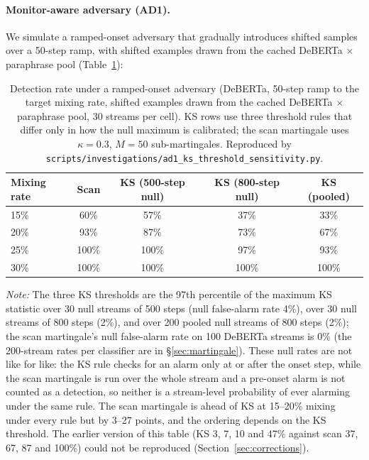 \documentclass{article}
\begin{document}
\paragraph{Monitor-aware adversary (AD1).} We simulate a ramped-onset adversary that gradually introduces shifted samples over a 50-step ramp, with shifted examples drawn from the cached DeBERTa $\times$ paraphrase pool (Table~\ref{tab:ad1}):

\begin{table}[h]
\centering
\small
\caption{Detection rate under a ramped-onset adversary (DeBERTa, 50-step ramp to the target mixing rate, shifted examples drawn from the cached DeBERTa $\times$ paraphrase pool, 30 streams per cell). KS rows use three threshold rules that differ only in how the null maximum is calibrated; the scan martingale uses $\kappa=0.3$, $M=50$ sub-martingales. Reproduced by \texttt{scripts/investigations/ad1\_ks\_threshold\_sensitivity.py}.}
\label{tab:ad1}
\begin{tabular}{lcccc}
\toprule
\textbf{Mixing rate} & \textbf{Scan} & \textbf{KS (500-step null)} & \textbf{KS (800-step null)} & \textbf{KS (pooled)} \\
\midrule
15\% & 60\% & 57\% & 37\% & 33\% \\
20\% & 93\% & 87\% & 73\% & 67\% \\
25\% & 100\% & 100\% & 97\% & 93\% \\
30\% & 100\% & 100\% & 100\% & 100\% \\
\bottomrule
\end{tabular}
\par\vspace{4pt}
{\footnotesize\textit{Note:} The three KS thresholds are the 97th percentile of the maximum KS statistic over 30 null streams of 500 steps (null false-alarm rate 4\%), over 30 null streams of 800 steps (2\%), and over 200 pooled null streams of 800 steps (2\%); the scan martingale's null false-alarm rate on 100 DeBERTa streams is 0\% (the 200-stream rates per classifier are in \S\ref{sec:martingale}). These null rates are not like for like: the KS rule checks for an alarm only at or after the onset step, while the scan martingale is run over the whole stream and a pre-onset alarm is not counted as a detection, so neither is a stream-level probability of ever alarming under the same rule. The scan martingale is ahead of KS at 15--20\% mixing under every rule but by 3--27 points, and the ordering depends on the KS threshold. The earlier version of this table (KS 3, 7, 10 and 47\% against scan 37, 67, 87 and 100\%) could not be reproduced (Section~\ref{sec:corrections}).}
\end{table}
\end{document}
